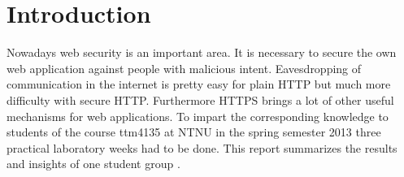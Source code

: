 \section {Introduction}
Nowadays web security is an important area. It is necessary to secure the own web application against people with malicious intent. Eavesdropping of communication in the internet is pretty easy for plain HTTP but much more difficulty with secure HTTP.  Furthermore HTTPS brings a lot of other useful mechanisms for web applications. 
To impart the corresponding knowledge to students of the course ttm4135 at NTNU in the spring semester 2013 three practical laboratory weeks had to be done. This report summarizes the results and insights of one student group .
